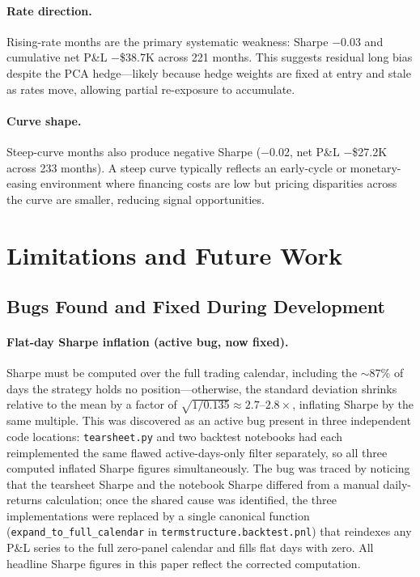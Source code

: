 \documentclass[11pt]{article}
\begin{document}
\paragraph{Rate direction.}
Rising-rate months are the primary systematic weakness: Sharpe $-$0.03 and
cumulative net P\&L $-$\$38.7K across 221 months. This suggests residual
long bias despite the PCA hedge---likely because hedge weights are fixed at
entry and stale as rates move, allowing partial re-exposure to accumulate.

\paragraph{Curve shape.}
Steep-curve months also produce negative Sharpe ($-$0.02, net P\&L $-$\$27.2K
across 233 months). A steep curve typically reflects an early-cycle or
monetary-easing environment where financing costs are low but pricing
disparities across the curve are smaller, reducing signal opportunities.

\section{Limitations and Future Work}

\subsection{Bugs Found and Fixed During Development}

\paragraph{Flat-day Sharpe inflation (active bug, now fixed).}
Sharpe must be computed over the full trading calendar, including the $\sim$87\%
of days the strategy holds no position---otherwise, the standard deviation
shrinks relative to the mean by a factor of $\sqrt{1/0.135} \approx 2.7\text{--}2.8\times$,
inflating Sharpe by the same multiple. This was discovered as an active bug
present in three independent code locations: \texttt{tearsheet.py} and two
backtest notebooks had each reimplemented the same flawed active-days-only
filter separately, so all three computed inflated Sharpe figures
simultaneously. The bug was traced by noticing that the tearsheet Sharpe and
the notebook Sharpe differed from a manual daily-returns calculation; once the
shared cause was identified, the three implementations were replaced by a
single canonical function (\texttt{expand\_to\_full\_calendar} in
\texttt{termstructure.backtest.pnl}) that reindexes any P\&L series to the
full zero-panel calendar and fills flat days with zero. All headline Sharpe
figures in this paper reflect the corrected computation.
\end{document}
